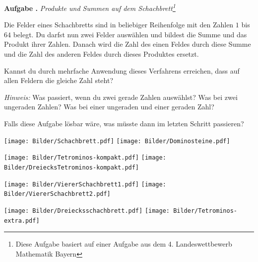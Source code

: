 \documentclass[a4paper,ngerman,12pt]{scrartcl}
\theoremstyle{definition}
\theoremstyle{plain}
\theoremstyle{remark}
\newlength{\aufgabenskip}
\newcounter{aufgabennummer}
\newenvironment{aufgabe}[1]{
	\addtocounter{aufgabennummer}{1}
	\textbf{Aufgabe \theaufgabennummer.} \emph{#1} \par
}{\vspace{\aufgabenskip}}
\begin{document}
\newpage
\begin{aufgabe}{Produkte und Summen auf dem Schachbrett\footnote{Diese Aufgabe basiert auf einer Aufgabe aus dem 4. Landeswettbewerb Mathematik Bayern}}
	Die Felder eines Schachbretts sind in beliebiger Reihenfolge mit den Zahlen $1$ bis $64$ belegt. Du darfst nun zwei Felder auswählen und bildest die Summe und das Produkt ihrer Zahlen. Danach wird die Zahl des einen Feldes durch diese Summe und die Zahl des anderen Feldes durch dieses Produktes ersetzt. 
	
	Kannst du durch mehrfache Anwendung dieses Verfahrens erreichen, dass auf allen Feldern die gleiche Zahl steht?
	
	\emph{Hinweis:} Was passiert, wenn du zwei gerade Zahlen auswählst? Was bei zwei ungeraden Zahlen? Was bei einer ungeraden und einer geraden Zahl?
	
	Falls diese Aufgabe lösbar wäre, was müsste dann im letzten Schritt passieren?
\end{aufgabe}

\newpage

\texttt{[image: Bilder/Schachbrett.pdf]}
\texttt{[image: Bilder/Dominosteine.pdf]}

\texttt{[image: Bilder/Tetrominos-kompakt.pdf]}
\texttt{[image: Bilder/DreiecksTetrominos-kompakt.pdf]}

\texttt{[image: Bilder/ViererSchachbrett1.pdf]}
\texttt{[image: Bilder/ViererSchachbrett2.pdf]}

\texttt{[image: Bilder/Dreiecksschachbrett.pdf]}
\texttt{[image: Bilder/Tetrominos-extra.pdf]}
\end{document}
